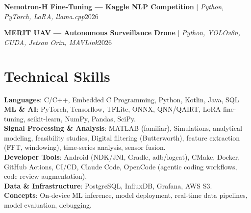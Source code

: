 \documentclass[letterpaper,11pt]{article}
\begin{document}
    \resumeProjectHeading
        {\textbf{Nemotron-H Fine-Tuning --- Kaggle NLP Competition} $|$
          \emph{Python, PyTorch, LoRA, llama.cpp}}{2026}
        \resumeItemListStart
        \resumeItemListEnd

    \resumeProjectHeading
        {\textbf{MERIT UAV --- Autonomous Surveillance Drone} $|$
          \emph{Python, YOLOv8n, CUDA, Jetson Orin, MAVLink}}{2026}
        \resumeItemListStart
        \resumeItemListEnd

  \resumeSubHeadingListEnd

\section{Technical Skills}
  \resumeSubHeadingListStart
    \small{
      \item{
        \textbf{Languages}{: C/C++, Embedded C Programming,  Python, Kotlin, Java, SQL} \\
        \textbf{ML \& AI}{: PyTorch, Tensorflow, TFLite, ONNX, QNN/QAIRT, LoRA fine-tuning, scikit-learn, NumPy, Pandas, SciPy.} \\
        \textbf{Signal Processing \& Analysis}{: MATLAB (familiar), Simulations, analytical modeling, feasibility studies, Digital filtering (Butterworth), feature extraction (FFT, windowing), time-series analysis, sensor fusion.} \\
        \textbf{Developer Tools}{: Android (NDK/JNI, Gradle, adb/logcat), CMake, Docker, GitHub Actions, CI/CD, Claude Code, OpenCode (agentic coding workflows, code review augmentation).} \\
        \textbf{Data \& Infrastructure}{: PostgreSQL, InfluxDB, Grafana, AWS S3.} \\
        \textbf{Concepts}{: On-device ML inference, model deployment, real-time data pipelines, model evaluation, debugging.}
      }
    }
  \resumeSubHeadingListEnd
\end{document}
